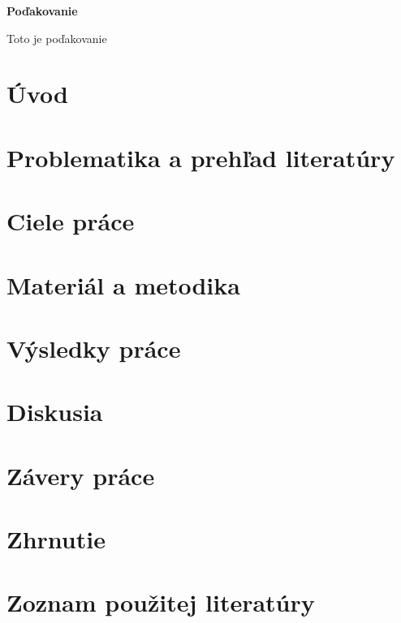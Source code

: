 \documentclass[12pt]{article}
\begin{document}
\null
\vfill

\noindent
\textbf{Poďakovanie}

\noindent
Toto je poďakovanie

\vspace{8cm}
\newpage


%
%

\thispagestyle{empty}
\tableofcontents
\newpage


%
%

\section*{Úvod}

\section{Problematika a prehľad literatúry}
\section{Ciele práce}
\section{Materiál a metodika}
\section{Výsledky práce}
\section{Diskusia}
\section{Závery práce}
\section{Zhrnutie}
\section{Zoznam použitej literatúry}
\end{document}
